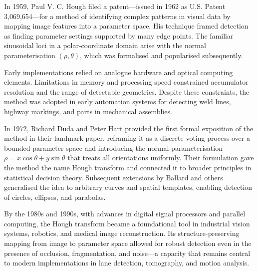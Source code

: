 
\begin{historical}
In 1959, Paul V. C. Hough filed a patent—issued in 1962 as U.S. Patent 3,069,654—for a method of identifying complex patterns in visual data by mapping image features into a parameter space. His technique framed detection as finding parameter settings supported by many edge points. The familiar sinusoidal loci in a polar-coordinate domain arise with the normal parameterisation \((\rho,\theta)\), which was formalised and popularised subsequently.

Early implementations relied on analogue hardware and optical computing elements. Limitations in memory and processing speed constrained accumulator resolution and the range of detectable geometries. Despite these constraints, the method was adopted in early automation systems for detecting weld lines, highway markings, and parts in mechanical assemblies.

In 1972, Richard Duda and Peter Hart provided the first formal exposition of the method in their landmark paper, reframing it as a discrete voting process over a bounded parameter space and introducing the normal parameterisation \(\rho = x\cos\theta + y\sin\theta\) that treats all orientations uniformly. Their formulation gave the method the name \QSOpen{}Hough transform\QSClose{} and connected it to broader principles in statistical decision theory. Subsequent extensions by Ballard and others generalised the idea to arbitrary curves and spatial templates, enabling detection of circles, ellipses, and parabolas.

By the 1980s and 1990s, with advances in digital signal processors and parallel computing, the Hough transform became a foundational tool in industrial vision systems, robotics, and medical image reconstruction. Its structure-preserving mapping from image to parameter space allowed for robust detection even in the presence of occlusion, fragmentation, and noise—a capacity that remains central to modern implementations in lane detection, tomography, and motion analysis. 
\end{historical}